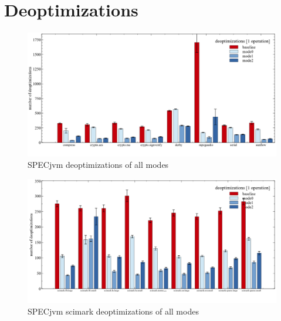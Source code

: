 \section{Deoptimizations}
\label{s:perf_deoptimizations}

\begin{figure}[ht]
  \begin{center}
    \centering
    \includegraphics[width=1.0\textwidth]{figures/others_warmup_deopt.png}
    \caption{SPECjvm deoptimizations of all modes}
    \label{f:others_warmup_deopt}
  \end{center}
\end{figure}

\begin{figure}[ht]
  \begin{center}
    \centering
    \includegraphics[width=1.0\textwidth]{figures/scimark_warmup_deopt.png}
    \caption{SPECjvm scimark deoptimizations of all modes}
    \label{f:scimark_warmup_deopt}
  \end{center}
\end{figure}

